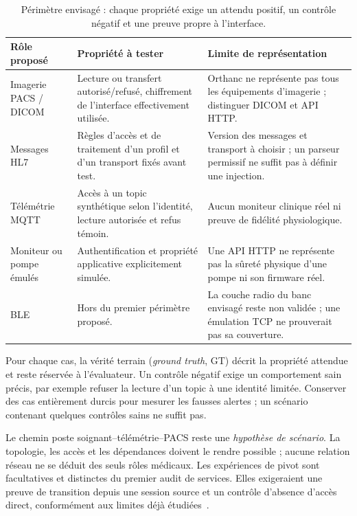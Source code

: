 \documentclass[11pt,a4paper]{article}
\begin{document}
\begin{table}[H]\centering\small
\begin{tabularx}{\linewidth}{@{}>{\raggedright\arraybackslash}p{31mm}YY@{}}\toprule
Rôle proposé & Propriété à tester & Limite de représentation \\\midrule
Imagerie PACS / DICOM & Lecture ou transfert autorisé/refusé, chiffrement de l'interface effectivement utilisée. & Orthanc ne représente pas tous les équipements d'imagerie ; distinguer DICOM et API HTTP. \\
Messages HL7 & Règles d'accès et de traitement d'un profil et d'un transport fixés avant test. & Version des messages et transport à choisir ; un parseur permissif ne suffit pas à définir une injection. \\
Télémétrie MQTT & Accès à un topic synthétique selon l'identité, lecture autorisée et refus témoin. & Aucun moniteur clinique réel ni preuve de fidélité physiologique. \\
Moniteur ou pompe émulés & Authentification et propriété applicative explicitement simulée. & Une API HTTP ne représente pas la sûreté physique d'une pompe ni son firmware réel. \\
BLE & Hors du premier périmètre proposé. & La couche radio du banc envisagé reste non validée ; une émulation TCP ne prouverait pas sa couverture. \\\bottomrule
\end{tabularx}
\caption{Périmètre envisagé : chaque propriété exige un attendu positif, un contrôle négatif et une preuve propre à l'interface.}\label{tab:scope}
\end{table}

Pour chaque cas, la vérité terrain (\emph{ground truth}, GT) décrit la propriété
attendue et reste réservée à l'évaluateur. Un contrôle négatif exige un
comportement sain précis, par exemple refuser la lecture d'un topic à une
identité limitée. Conserver des cas entièrement durcis pour mesurer les
fausses alertes ; un scénario contenant quelques contrôles sains ne suffit pas.

Le chemin poste soignant--télémétrie--PACS reste une \emph{hypothèse de scénario}.
La topologie, les accès et les dépendances doivent le rendre possible ; aucune
relation réseau ne se déduit des seuls rôles médicaux. Les expériences de pivot
sont facultatives et distinctes du premier audit de services. Elles exigeraient
une preuve de transition depuis une session source et un contrôle d'absence
d'accès direct, conformément aux limites déjà étudiées~\cite{benchmark}.
\end{document}
